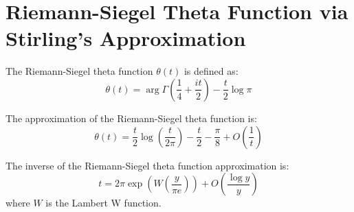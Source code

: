 \documentclass{article}
\begin{document}
\section{Riemann-Siegel Theta Function via Stirling's Approximation}

The Riemann-Siegel theta function $\theta(t)$ is defined as:
\[ \theta(t) = \arg\Gamma\left(\frac{1}{4}+\frac{it}{2}\right) - \frac{t}{2}\log\pi \]

\begin{theorem}
The approximation of the Riemann-Siegel theta function is:
\[
\boxed{
\theta(t) = \frac{t}{2}\log\left(\frac{t}{2\pi}\right) - \frac{t}{2} - \frac{\pi}{8} + O\left(\frac{1}{t}\right)
}
\]
\end{theorem}

\begin{theorem}
The inverse of the Riemann-Siegel theta function approximation is:
\[
\boxed{
t = 2\pi\exp\left(W\left(\frac{y}{\pi e}\right)\right) + O\left(\frac{\log y}{y}\right)
}
\]
where $W$ is the Lambert W function.
\end{theorem}
\end{document}
